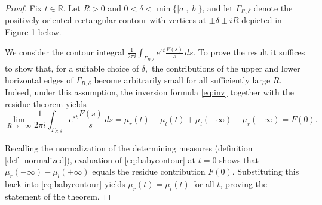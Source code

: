\documentclass[12pt]{article}
\theoremstyle{definition}
\begin{document}
\begin{proof}
    
  Fix \( t \in \mathbb{R} \). Let \( R>0 \) and \( 0<\delta<\min\{|a|,|b|\} \), and let \( \Gamma_{R,\delta} \) denote the positively oriented rectangular contour with vertices at \( \pm\delta \pm iR \) depicted in Figure 1 below. 





\begin{center}
\end{center}

We consider the contour integral $\displaystyle{\frac{1}{2\pi i}\int_{\Gamma_{R,\delta}} e^{st}\frac{F(s)}{s}\,ds.}$
To prove the result it suffices to show that, for a suitable choice of $\delta,$ the contributions of the upper and lower horizontal edges of \( \Gamma_{R,\delta} \) become arbitrarily small for all sufficiently large $R.$ 
Indeed, under this assumption, the inversion formula \eqref{eq:inv} together with the residue theorem yields
\begin{equation}\label{eq:babycontour}
\lim_{R\to+\infty}\frac{1}{2\pi i}\int_{\Gamma_{R,\delta}} e^{st}\frac{F(s)}{s}\,ds
= \mu_r(t)-\mu_l(t)+\mu_l(+\infty)-\mu_r(-\infty)=F(0).
\end{equation}


\noindent Recalling the normalization of the determining measures (definition \ref{def_normalized}), 
evaluation of \eqref{eq:babycontour} at \( t=0 \) shows that
\( \mu_r(-\infty)-\mu_l(+\infty) \) equals the residue contribution $F(0)$. Substituting this back into
\eqref{eq:babycontour} yields \( \mu_r(t)=\mu_l(t) \) for all \( t \), proving the statement of the theorem.


\end{proof}
\end{document}
